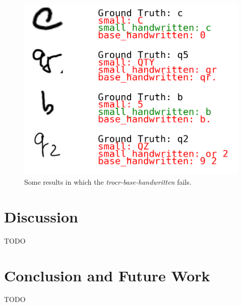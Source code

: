 \documentclass[conference]{IEEEtran}
\begin{document}
\begin{figure}[H]
\centering
\includegraphics[width=\linewidth]{text_digitization_results_2.png}
\caption{Some results in which the \textit{trocr-base-handwritten} fails.}
\label{fig:text_digitization_results_2}
\end{figure}

\section{Discussion}
TODO

\section{Conclusion and Future Work}
TODO



\newpage

\newpage
\end{document}
